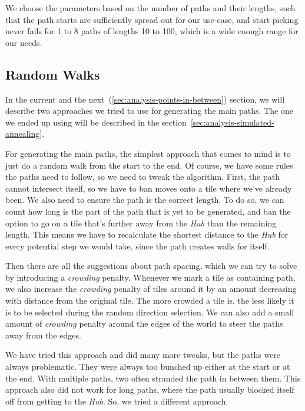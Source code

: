 We choose the parameters based on the number of paths and their lengths, such that the path starts are sufficiently spread out for our use-case, and start picking never fails for 1 to 8 paths of lengths 10 to 100, which is a wide enough range for our needs.

\subsection{Random Walks}\label{sec:analysis-random-walks}

In the current and the next~(\ref{sec:analysis-points-in-between}) section, we will describe two approaches we tried to use for generating the main paths.
The one we ended up using will be described in the section~\ref{sec:analysis-simulated-annealing}.

For generating the main paths, the simplest approach that comes to mind is to just do a random walk from the start to the end.
Of course, we have some rules the paths need to follow, so we need to tweak the algorithm.
First, the path cannot intersect itself, so we have to ban moves onto a tile where we've already been.
We also need to ensure the path is the correct length.
To do so, we can count how long is the part of the path that is yet to be generated, and ban the option to go on a tile that's further away from the \emph{Hub} than the remaining length.
This means we have to recalculate the shortest distance to the \emph{Hub} for every potential step we would take, since the path creates walls for itself.

Then there are all the suggestions about path spacing, which we can try to solve by introducing a \emph{crowding} penalty.
Whenever we mark a tile as containing path, we also increase the \emph{crowding} penalty of tiles around it by an amount decreasing with distance from the original tile.
The more crowded a tile is, the less likely it is to be selected during the random direction selection.
We can also add a small amount of \emph{crowding} penalty around the edges of the world to steer the paths away from the edges.

We have tried this approach and did many more tweaks, but the paths were always problematic.
They were always too bunched up either at the start or at the end.
With multiple paths, two often stranded the path in between them.
This approach also did not work for long paths, where the path usually blocked itself off from getting to the \emph{Hub}.
So, we tried a different approach.

